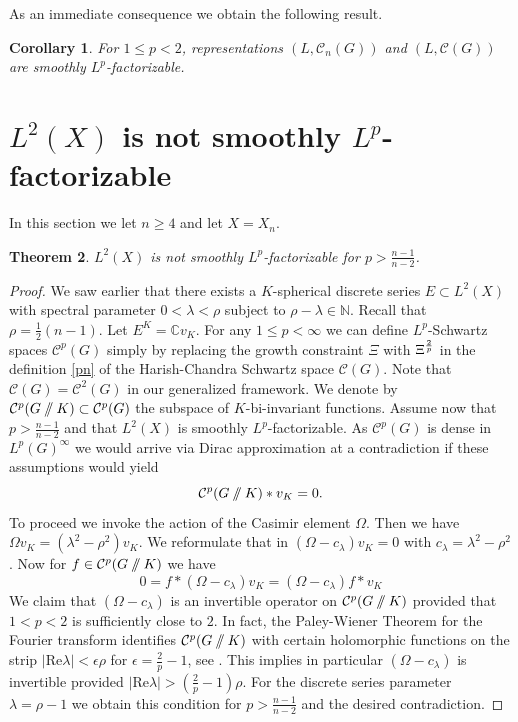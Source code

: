 \documentclass[12pt,letterpaper,titlepage,reqno]{amsart}
\theoremstyle{plain}
\newtheorem{theorem}{Theorem}[section]
\newtheorem{cor}[theorem]{Corollary}
\theoremstyle{definition}
\numberwithin{equation}{section}
\newcommand{\C}{\mathbb{C}}
\newcommand{\N}{\mathbb{N}}
\def\e{\epsilon}
\newcommand{\sslash}{\mathbin{/\mkern-6mu/}}
\begin{document}
As an immediate consequence we obtain the following result.
\begin{cor}\label{cor smoothlp} For $1\leq p<2$, representations
$(L, \mathcal{C}_n(G))$ and $(L, \mathcal{C}(G))$ are smoothly $L^p$-factorizable.
\end{cor}	

\section{$L^2(X)$ is not smoothly $L^p$-factorizable}

In this section we let $n\geq 4$ and let $X=X_n$.
\begin{theorem}\label{main theorem}  $L^2(X)$ is not smoothly $L^p$-factorizable for $p > \frac{n-1}{n-2}$.
\end{theorem}

\begin{proof} We saw earlier that there exists a $K$-spherical discrete series $E\subset L^2(X)$ with spectral parameter
$0<\lambda <\rho$ subject to $\rho -\lambda\in \N$.  Recall that $\rho = \frac{1}{2}(n-1)$. Let
$E^K=\C v_K$.  For any $1\leq p<\infty$ we can define $L^p$-Schwartz spaces
$\mathcal{C}^p(G)$ simply by replacing the growth constraint $\Xi$ with $\Xi^{2\over p}$ in the definition \eqref{pn} of the Harish-Chandra Schwartz space $\mathcal{C}(G)$. Note that $\mathcal{C}(G) = \mathcal{C}^2(G)$ in our generalized framework. We denote by
$\mathcal{C}^p(G\sslash K)\subset \mathcal{C}^p(G)$ the subspace of $K$-bi-invariant functions.
Assume now that $p > \frac{n-1}{n-2}$ and that $L^2(X)$ is smoothly $L^p$-factorizable.
As $\mathcal{C}^p(G)$ is dense in $L^p(G)^\infty$ we would arrive via Dirac approximation at a contradiction
if these assumptions would yield
\begin{equation} \mathcal{C}^p(G\sslash K) *v_K = {0}.\end{equation}
To proceed we invoke the action of the Casimir element $\Omega$.
Then we have $\Omega v_K = (\lambda^2 - \rho^2)v_K$. We reformulate that in
$(\Omega - c_\lambda)v_K =0$ with $c_\lambda = \lambda^2 -\rho^2$.
Now for $f \in \mathcal{C}^p(G\sslash K)$ we have
$$ 0= f* (\Omega - c_\lambda)v_K =(\Omega - c_\lambda)f *v_K $$
We claim that $(\Omega - c_\lambda)$ is an invertible operator on $\mathcal{C}^p(G\sslash K)$ provided that $1<p<2$ is sufficiently close to $2$. In fact, the Paley-Wiener Theorem for the Fourier transform identifies $\mathcal{C}^p(G\sslash K)$ with certain holomorphic functions on the strip
$|\mathrm{Re} \lambda|<\epsilon \rho$ for $\e = \frac{2}{p} - 1$, see \cite[Th. 7.8.6]{GV}.  This implies in particular $(\Omega- c_\lambda)$ is invertible provided
$|\mathrm{Re} \lambda|> ( \frac{2}{p} - 1)\rho $. For the discrete series parameter $\lambda= \rho-1$ we obtain this condition for $p > \frac{n-1}{n-2}$ and the desired contradiction.
\end{proof}
\end{document}
